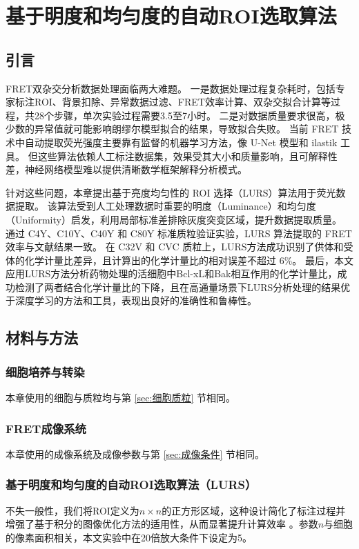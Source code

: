 \chapter{基于明度和均匀度的自动ROI选取算法}

\section{引言}

\ifshowtext
FRET双杂交分析数据处理面临两大难题。
一是数据处理过程复杂耗时，包括专家标注ROI、背景扣除、异常数据过滤、FRET效率计算、双杂交拟合计算等过程，共28个步骤，单次实验过程需要3.5至7小时。
二是对数据质量要求很高，极少数的异常值就可能影响朗缪尔模型拟合的结果，导致拟合失败。
当前 FRET 技术中自动提取荧光强度主要靠有监督的机器学习方法，像 U-Net 模型和 ilastik 工具。
但这些算法依赖人工标注数据集，效果受其大小和质量影响，且可解释性差，神经网络模型难以提供清晰数学框架解释分析模式。

针对这些问题，本章提出基于亮度均匀性的 ROI 选择（LURS）算法用于荧光数据提取。
该算法受到人工处理数据时重要的明度（Luminance）和均匀度（Uniformity）启发，利用局部标准差排除灰度突变区域，提升数据提取质量。
通过 C4Y、C10Y、C40Y 和 C80Y 标准质粒验证实验，LURS 算法提取的 FRET 效率与文献结果一致。
在 C32V 和 CVC 质粒上，LURS方法成功识别了供体和受体的化学计量比差异，且计算出的化学计量比的相对误差不超过 6\%。
最后，本文应用LURS方法分析药物处理的活细胞中Bcl-xL和Bak相互作用的化学计量比，成功检测了两者结合化学计量比的下降，且在高通量场景下LURS分析处理的结果优于深度学习的方法和工具，表现出良好的准确性和鲁棒性。
\fi

\section{材料与方法}
\subsection{细胞培养与转染}
本章使用的细胞与质粒均与第 \ref{sec:细胞质粒} 节相同。

\subsection{FRET成像系统}
本章使用的成像系统及成像参数与第 \ref{sec:成像条件} 节相同。

\subsection{基于明度和均匀度的自动ROI选取算法（LURS）}
不失一般性，我们将ROI定义为$n \times n$的正方形区域，这种设计简化了标注过程并增强了基于积分的图像优化方法的适用性，从而显著提升计算效率 。参数$n$与细胞的像素面积相关，本文实验中在20倍放大条件下设定为5。

